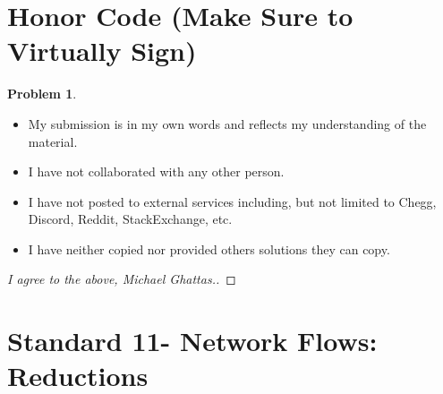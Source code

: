 \documentclass[11pt]{article}
\theoremstyle{definition}
\theoremstyle{definition}
\newtheorem{required}{Problem}
\theoremstyle{definition}
\begin{document}
\section{Honor Code (Make Sure to Virtually Sign)} \label{HonorCode}

\begin{required}
\noindent 
\begin{itemize}
\item My submission is in my own words and reflects my understanding of the material.
\item I have not collaborated with any other person.
\item I have not posted to external services including, but not limited to Chegg, Discord, Reddit, StackExchange, etc.
\item I have neither copied nor provided others solutions they can copy.
\end{itemize}

\end{required}

\begin{proof}[I agree to the above, Michael Ghattas.]
\end{proof}

\newpage
\section{Standard 11- Network Flows: Reductions}
\end{document}
